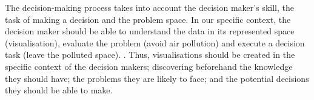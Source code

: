 The decision-making process takes into account the decision maker's skill, the task of making a decision and the problem space. In our specific context, the decision maker should be able to understand the data in its represented space (visualisation), evaluate the problem (avoid air pollution) and execute a decision task (leave the polluted space).  \cite{Zhu2008}. Thus, visualisations should be created in the specific context of the decision makers; discovering beforehand the knowledge they should have; the problems they are likely to face; and the potential decisions they should be able to make. 
